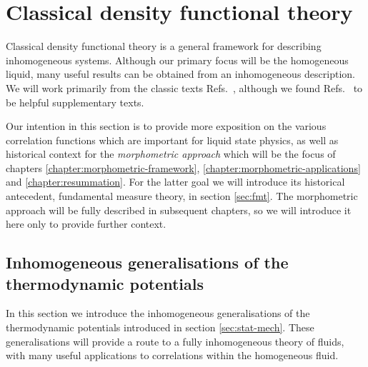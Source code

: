 \section{Classical density functional theory}
\label{sec:dft}

Classical density functional theory is a general framework for describing inhomogeneous systems.
Although our primary focus will be the homogeneous liquid, many useful results can be obtained from an inhomogeneous description.
We will work primarily from the classic texts Refs.\ \cite{EvansAP1979,Evans1989,EvansFoIF1992}, although we found Refs.\ \cite{AshcroftAJP1996,Hansen2013} to be helpful supplementary texts.

Our intention in this section is to provide more exposition on the various correlation functions which are important for liquid state physics, as well as historical context for the \emph{morphometric approach} which will be the focus of chapters \ref{chapter:morphometric-framework}, \ref{chapter:morphometric-applications} and \ref{chapter:resummation}.
For the latter goal we will introduce its historical antecedent, fundamental measure theory, in section \ref{sec:fmt}.
The morphometric approach will be fully described in subsequent chapters, so we will introduce it here only to provide further context.

\subsection{Inhomogeneous generalisations of the thermodynamic potentials}
\label{sec:inhomogeneous-potentials}

In this section we introduce the inhomogeneous generalisations of the thermodynamic potentials introduced in section \ref{sec:stat-mech}.
These generalisations will provide a route to a fully inhomogeneous theory of fluids, with many useful applications to correlations within the homogeneous fluid.

